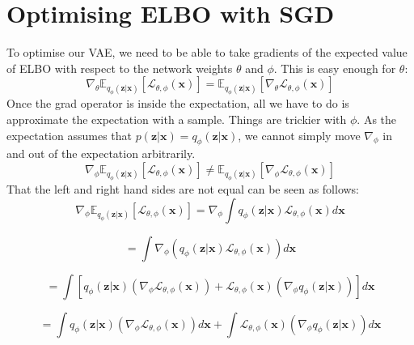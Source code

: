 \documentclass[]{article}
\begin{document}
\section{Optimising ELBO with SGD}
To optimise our VAE, we need to be able to take gradients of the expected value of ELBO with respect to the network weights $\theta$ and $\phi$. This is easy enough for $\theta$:
\begin{equation} \nabla_{\theta}\mathbb{E}_{q_{\phi}(\mathbf{z}|\mathbf{x})}[\mathcal{L}_{\theta, \phi}(\mathbf{x})] = \mathbb{E}_{q_{\phi}(\mathbf{z}|\mathbf{x})}[\nabla_{\theta} \mathcal{L}_{\theta, \phi}(\mathbf{x})]
\end{equation}
Once the grad operator is inside the expectation, all we have to do is approximate the expectation with a sample. 
\newline
\newline
Things are trickier with $\phi$. As the expectation assumes that $p(\mathbf{z}|\mathbf{x}) = q_{\phi}(\mathbf{z}|\mathbf{x})$, we cannot simply move $\nabla_{\phi}$ in and out of the expectation arbitrarily.
\begin{equation} \nabla_{\phi}\mathbb{E}_{q_{\phi}(\mathbf{z}|\mathbf{x})}[\mathcal{L}_{\theta, \phi}(\mathbf{x})] \neq \mathbb{E}_{q_{\phi}(\mathbf{z}|\mathbf{x})}[\nabla_{\phi} \mathcal{L}_{\theta, \phi}(\mathbf{x})]
\end{equation}
That the left and right hand sides are not equal can be seen as follows:
\begin{equation} \nabla_{\phi}\mathbb{E}_{q_{\phi}(\mathbf{z}|\mathbf{x})}[\mathcal{L}_{\theta, \phi}(\mathbf{x})] = \nabla_{\phi} \int q_{\phi}(\mathbf{z}|\mathbf{x}) \mathcal{L}_{\theta, \phi}(\mathbf{x}) d\mathbf{x}
\end{equation}

\begin{equation}
= \int \nabla_{\phi}(q_{\phi}(\mathbf{z}|\mathbf{x}) \mathcal{L}_{\theta, \phi}(\mathbf{x})) d\mathbf{x}
\end{equation}

\begin{equation}
= \int [q_{\phi}(\mathbf{z}|\mathbf{x})(\nabla_{\phi} \mathcal{L}_{\theta, \phi}(\mathbf{x})) + \mathcal{L}_{\theta, \phi}(\mathbf{x}) (\nabla_{\phi} q_{\phi}(\mathbf{z}|\mathbf{x}))] d\mathbf{x}
\end{equation}

\begin{equation}
= \int q_{\phi}(\mathbf{z}|\mathbf{x})(\nabla_{\phi} \mathcal{L}_{\theta, \phi}(\mathbf{x})) d\mathbf{x} + \int \mathcal{L}_{\theta, \phi}(\mathbf{x}) (\nabla_{\phi} q_{\phi}(\mathbf{z}|\mathbf{x})) d\mathbf{x}
\end{equation}
\end{document}
